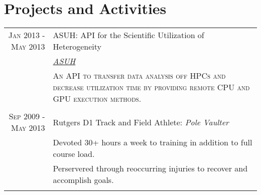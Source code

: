 \documentclass[a4paper,10pt, onepage]{article} %
\begin{document}

\section{Projects and Activities}

\begin{tabular}{rp{10cm}}
\textsc{Jan 2013 - May 2013} & ASUH: API for the Scientific Utilization of Heterogeneity\\
& \small\emph{\href{http://github.com/jlee734/ASUH}{ASUH}}\\
& \small\textsc{An API to transfer data analysis off HPCs and decrease utilization time by providing remote CPU and GPU execution methods.}\\
\multicolumn{2}{c}{}\\

\textsc{Sep 2009 - May 2013} & Rutgers D1 Track and Field Athlete: \emph{Pole Vaulter}\\
& \small{Devoted 30+ hours a week to training in addition to full course load.}\\
& \small{Perservered through reoccurring injuries to recover and accomplish goals.}\\
\multicolumn{2}{c}{}\\


\end{tabular}




\end{document}
